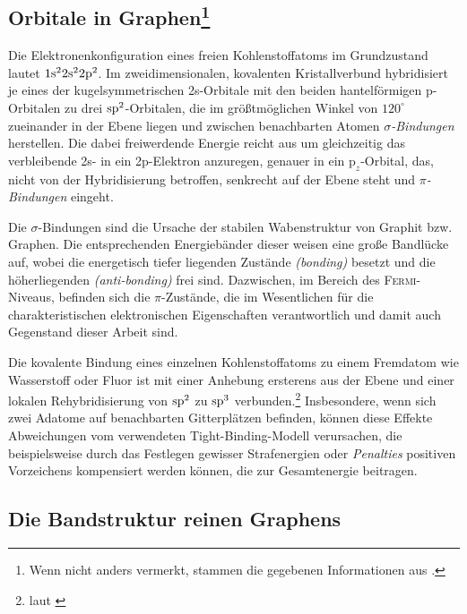 \documentclass[a4paper, 10pt, twoside, openany]{book} %
\begin{document}
\subsection[Orbitale in Graphen]{Orbitale in Graphen\footnote{Wenn nicht anders vermerkt, stammen die gegebenen Informationen aus \cite[S.~1, 2, 5 u. 7]{Katsnelson1}.}}
\label{Orbitale in Graphen}

Die Elektronenkonfiguration eines freien Kohlenstoffatoms im Grundzustand lautet $\rm 1s^2 2s^2 2p^2$. Im zweidimensionalen, kovalenten Kristallverbund hybridisiert je eines der kugelsymmetrischen 2s-Orbitale mit den beiden hantelförmigen p-Orbitalen zu drei $\rm sp^2$-Orbitalen, die im größtmöglichen Winkel von $120^\circ$ zueinander in der Ebene liegen und zwischen benachbarten Atomen \emph{$\sigma$-Bindungen} herstellen. Die dabei freiwerdende Energie reicht aus um gleichzeitig das verbleibende 2s- in ein 2p-Elektron anzuregen, genauer in ein $\mathrm p_z$-Orbital, das, nicht von der Hybridisierung betroffen, senkrecht auf der Ebene steht und \emph{$\pi$-Bindungen} eingeht.

Die $\sigma$-Bindungen sind die Ursache der stabilen Wabenstruktur von Graphit bzw. Graphen. Die entsprechenden Energiebänder dieser weisen eine große Bandlücke auf, wobei die energetisch tiefer liegenden Zustände \emph{(bonding)} besetzt und die höherliegenden \emph{(anti-bonding)} frei sind. Dazwischen, im Bereich des \textsc{Fermi}-Niveaus, befinden sich die $\pi$-Zustände, die im Wesentlichen für die charakteristischen elektronischen Eigenschaften verantwortlich und damit auch Gegenstand dieser Arbeit sind.

Die kovalente Bindung eines einzelnen Kohlenstoffatoms zu einem Fremdatom wie Wasserstoff oder Fluor ist mit einer Anhebung ersterens aus der Ebene und einer lokalen Rehybridisierung von $\rm sp^2$ zu $\rm sp^3$ verbunden.\footnote{laut \cite[S.~1]{Wehling2}} Insbesondere, wenn sich zwei Adatome auf benachbarten Gitterplätzen befinden, können diese Effekte Abweichungen vom verwendeten Tight-Binding-Modell verursachen, die beispielsweise durch das Festlegen gewisser Strafenergien oder \emph{Penalties} positiven Vorzeichens kompensiert werden können, die zur Gesamtenergie beitragen.

\subsection{Die Bandstruktur reinen Graphens}
\end{document}
